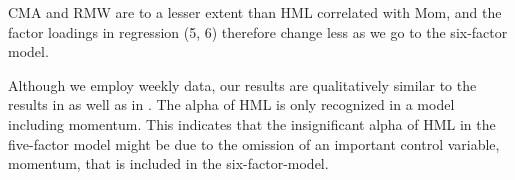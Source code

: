 CMA and RMW are to a lesser extent than HML correlated with Mom, and the factor loadings in regression (5, 6) therefore change less as we go to the six-factor model.

Although we employ weekly data, our results are qualitatively similar to the results in \textcite{FF2015} as well as in \textcite{Asness2015}. The alpha of HML is only recognized in a model including momentum. This indicates that the insignificant alpha of HML in the five-factor model might be due to the omission of an important control variable, momentum, that is included in the six-factor-model.


